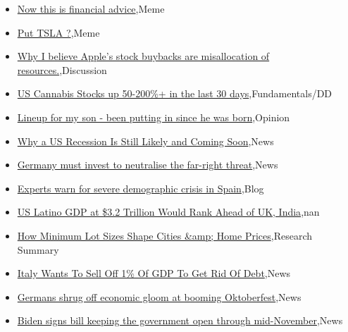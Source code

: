 \documentclass{article}%
\begin{document}
%
\begin{itemize}%
\item%
\href{https://reddit.com/r/wallstreetbets/comments/16xqv8h/now\_this\_is\_financial\_advice/}{Now this is financial advice},Meme%
\item%
\href{https://reddit.com/r/wallstreetbets/comments/16xnssh/put\_tsla/}{Put TSLA ?},Meme%
\item%
\href{https://reddit.com/r/wallstreetbets/comments/16xlfkr/why\_i\_believe\_apples\_stock\_buybacks\_are/}{Why I believe Apple's stock buybacks are misallocation of resources.},Discussion%
\item%
\href{https://reddit.com/r/StockMarket/comments/16xu286/us\_cannabis\_stocks\_up\_50200\_in\_the\_last\_30\_days/}{US Cannabis Stocks up 50-200\%+ in the last 30 days},Fundamentals/DD%
\item%
\href{https://reddit.com/r/StockMarket/comments/16xb91h/lineup\_for\_my\_son\_been\_putting\_in\_since\_he\_was/}{Lineup for my son - been putting in since he was born},Opinion%
\item%
\href{https://reddit.com/r/Economics/comments/16xouf0/why\_a\_us\_recession\_is\_still\_likely\_and\_coming\_soon/}{Why a US Recession Is Still Likely  and Coming Soon},News%
\item%
\href{https://reddit.com/r/Economics/comments/16xoibr/germany\_must\_invest\_to\_neutralise\_the\_farright/}{Germany must invest to neutralise the far-right threat},News%
\item%
\href{https://reddit.com/r/Economics/comments/16xfngd/experts\_warn\_for\_severe\_demographic\_crisis\_in/}{Experts warn for severe demographic crisis in Spain},Blog%
\item%
\href{https://reddit.com/r/Economics/comments/16xe6w6/us\_latino\_gdp\_at\_32\_trillion\_would\_rank\_ahead\_of/}{US Latino GDP at \$3.2 Trillion Would Rank Ahead of UK, India},nan%
\item%
\href{https://reddit.com/r/Economics/comments/16x5go7/how\_minimum\_lot\_sizes\_shape\_cities\_home\_prices/}{How Minimum Lot Sizes Shape Cities \&amp; Home Prices},Research Summary%
\item%
\href{https://reddit.com/r/Economics/comments/16x1wls/italy\_wants\_to\_sell\_off\_1\_of\_gdp\_to\_get\_rid\_of/}{Italy Wants To Sell Off 1\% Of GDP To Get Rid Of Debt},News%
\item%
\href{https://reddit.com/r/Economics/comments/16x0heo/germans\_shrug\_off\_economic\_gloom\_at\_booming/}{Germans shrug off economic gloom at booming Oktoberfest},News%
\item%
\href{https://reddit.com/r/Economics/comments/16wyglz/biden\_signs\_bill\_keeping\_the\_government\_open/}{Biden signs bill keeping the government open through mid-November},News%
\end{itemize}%
\end{document}
